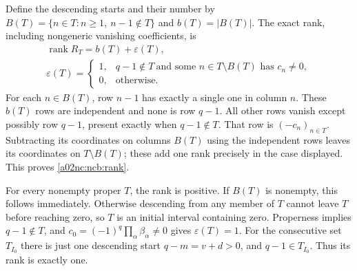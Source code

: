 Define the descending starts and their number by
$B(T)=\{n\in T:n\geq1,\ n-1\notin T\}$ and $b(T)=|B(T)|$.
The exact rank, including nongeneric vanishing coefficients, is
\begin{equation}\tag{NCB32}\label{a02nc:ncb:rank}
\begin{gathered}
\operatorname{rank}R_T=b(T)+\varepsilon(T),\\
\varepsilon(T)=
\begin{cases}
1,&q-1\notin T\ \text{and some }n\in T\setminus B(T)
                                    \text{ has }c_n\ne0,\\
0,&\text{otherwise}.
\end{cases}
\end{gathered}
\end{equation}
For each $n\in B(T)$, row $n-1$ has exactly a single one in column
$n$. These $b(T)$ rows are independent and none is row $q-1$.
All other rows vanish except possibly row $q-1$, present exactly when
$q-1\notin T$. That row is $(-c_n)_{n\in T}$.
Subtracting its coordinates on columns $B(T)$ using the independent
rows leaves its coordinates on $T\setminus B(T)$; these add one rank
precisely in the case displayed. This proves \eqref{a02nc:ncb:rank}.

For every nonempty proper $T$, the rank is positive. If $B(T)$ is
nonempty, this follows immediately. Otherwise descending from any
member of $T$ cannot leave $T$ before reaching zero, so $T$ is an
initial interval containing zero. Properness implies $q-1\notin T$,
and $c_0=(-1)^q\prod_\alpha\beta_\alpha\ne0$ gives
$\varepsilon(T)=1$. For the consecutive set $T_{I_0}$ there is just
one descending start $q-m=v+d>0$, and $q-1\in T_{I_0}$.
Thus its rank is exactly one.

